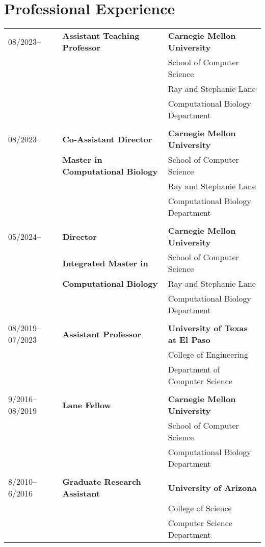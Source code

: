 \documentclass[10pt,letterpaper]{article}
\begin{document}
\section*{Professional Experience}
\begin{tabular}{lll}
08/2023-- & \textbf{Assistant Teaching Professor} & \textbf{Carnegie Mellon University}\\
				&						& School of Computer Science\\
				&						& Ray and Stephanie Lane \\
				&						& \hspace*{3em}Computational Biology Department\\
\\08/2023-- & 	\textbf{Co-Assistant Director} &  \textbf{Carnegie Mellon University}	\\
				&	\textbf{Master in Computational Biology}	& School of Computer Science\\
				&						&  Ray and Stephanie Lane \\
				&						& \hspace*{3em}Computational Biology Department\\
\\05/2024-- & 	\textbf{Director} &  \textbf{Carnegie Mellon University}\\
				&	\textbf{Integrated Master in }	& School of Computer Science\\
				&	\hspace*{3em}\textbf{Computational Biology}	& Ray and Stephanie Lane \\
				&						& \hspace*{3em}Computational Biology Department\\
\\ 08/2019--07/2023 & \textbf{Assistant Professor}	& \textbf{University of Texas at El Paso}\\
				&						& College of Engineering\\
				&						&  Department of Computer Science\\
\\9/2016--08/2019	& \textbf{Lane Fellow}		& \textbf{Carnegie Mellon University}\\
				&						& School of Computer Science\\
				&						& Computational Biology Department\\
				
\\8/2010--6/2016 & \textbf{Graduate Research Assistant} & \textbf{University of Arizona} \\
				&						& College of Science\\
				&						& Computer Science Department\\


\end{tabular}
\end{document}
